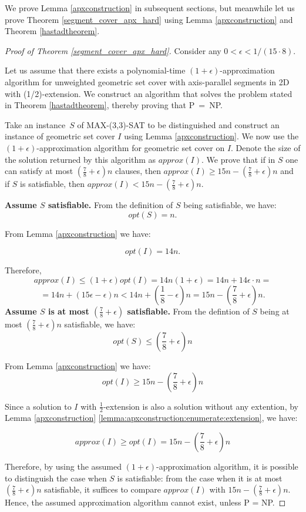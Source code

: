 We prove Lemma \ref{apxconstruction} in
subsequent sections, but meanwhile let us prove
Theorem \ref{segment_cover_apx_hard} using Lemma \ref{apxconstruction}
and Theorem \ref{hastadtheorem}.

\begin{proof}[Proof of Theorem \ref{segment_cover_apx_hard}]
Consider any $0 < \epsilon < 1/(15 \cdot 8)$.

Let us assume that there exists a polynomial-time
$(1+\epsilon)$-approximation algorithm
for unweighted geometric set cover with axis-parallel segments in 2D
with (1/2)-extension.
We construct an algorithm that solves the problem stated in 
Theorem \ref{hastadtheorem}, thereby proving that P~=~NP.

Take an instance~$S$ of MAX-(3,3)-SAT to be distinguished
and construct an instance of geometric set cover $I$
using Lemma \ref{apxconstruction}.
We now use the $(1+\epsilon)$-approximation algorithm
for geometric set cover on $I$.
Denote the size of the solution returned by this algorithm as $approx(I)$.
We prove that 
if in $S$
one can satisfy at most $(\frac{7}{8}+\epsilon)n$ clauses,
then $approx(I) \ge 15n - (\frac{7}{8} + \epsilon)n$
and if $S$ is
satisfiable, then $approx(I) < 15n - (\frac{7}{8} + \epsilon)n$.


\textbf{Assume $S$ satisfiable.}
From the definition of $S$ being satisfiable, we have:
$$opt(S) = n.$$

From Lemma \ref{apxconstruction} we have:

$$opt(I) = 14n.$$

Therefore,
$$approx(I) \le (1+\epsilon)opt(I) = 14n(1+\epsilon)
	= 14n + 14\epsilon\cdot n =$$ 
	$$= 14n + (15\epsilon - \epsilon)n < 
  14n + \left(\frac{1}{8} - \epsilon\right)n 
= 15n - \left(\frac{7}{8} + \epsilon\right)n.$$
\textbf{Assume $S$ is at most 
$\left(\frac{7}{8} + \epsilon\right)$ satisfiable.}
From the defintion of $S$ being at most 
$\left(\frac{7}{8} + \epsilon\right)n$ satisfiable, we have:
$$opt(S) \le \left(\frac{7}{8} + \epsilon\right)n$$

From Lemma \ref{apxconstruction} we have:
$$opt(I) \ge 15n - \left(\frac{7}{8} + \epsilon\right)n$$

Since a solution to $I$ with $\frac{1}{2}$-extension is
also a solution without any extention, by 
Lemma \ref{apxconstruction} \ref{lemma:apxconstruction:enumerate:extension}, we have:

$$approx(I) \ge opt(I) = 15n - \left(\frac{7}{8} + \epsilon\right)n$$


Therefore, by using the assumed $(1+\epsilon)$-approximation
algorithm,
it is possible to distinguish the case when
$S$ is satisfiable: from the case when it is
at most $(\frac{7}{8} + \epsilon)n$ satisfiable,
it suffices to compare $approx(I)$ with $15n - (\frac{7}{8}+\epsilon)n$.
Hence, the assumed approximation algorithm cannot exist, unless P = NP.
\end{proof}

